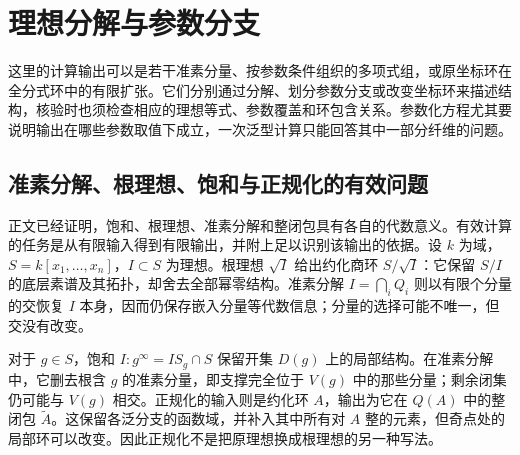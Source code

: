 
\section{理想分解与参数分支}
\label{b3:sec:B03}

这里的计算输出可以是若干准素分量、按参数条件组织的多项式组，或原坐标环在全分式环中的有限扩张。它们分别通过分解、划分参数分支或改变坐标环来描述结构，核验时也须检查相应的理想等式、参数覆盖和环包含关系。参数化方程尤其要说明输出在哪些参数取值下成立，一次泛型计算只能回答其中一部分纤维的问题。

%
%
%


\subsection{准素分解、根理想、饱和与正规化的有效问题}
\label{b3:subsec:B03:01}

正文已经证明，饱和、根理想、准素分解和整闭包具有各自的代数意义。有效计算的任务是从有限输入得到有限输出，并附上足以识别该输出的依据。设 \(k\) 为域，\(S=k[x_1,\ldots,x_n]\)，\(I\subset S\) 为理想。根理想 \(\sqrt I\) 给出约化商环 \(S/\sqrt I\)：它保留 \(S/I\) 的底层素谱及其拓扑，却舍去全部幂零结构。准素分解 \(I=\bigcap_iQ_i\) 则以有限个分量的交恢复 \(I\) 本身，因而仍保存嵌入分量等代数信息；分量的选择可能不唯一，但交没有改变。

\ProseParagraphBreak
对于 \(g\in S\)，饱和 \(I:g^\infty=IS_g\cap S\) 保留开集 \(D(g)\) 上的局部结构。在准素分解中，它删去根含 \(g\) 的准素分量，即支撑完全位于 \(V(g)\) 中的那些分量；剩余闭集仍可能与 \(V(g)\) 相交。正规化的输入则是约化环 \(A\)，输出为它在 \(Q(A)\) 中的整闭包 \(\widetilde A\)。这保留各泛分支的函数域，并补入其中所有对 \(A\) 整的元素，但奇点处的局部环可以改变。因此正规化不是把原理想换成根理想的另一种写法。


